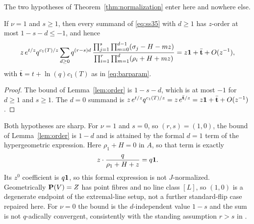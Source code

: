 The two hypotheses of Theorem~\ref{thm:normalization} enter here and nowhere
else.

\begin{corollary}
  \label{cor:normalized}
  If \(\nu=1\) and \(s\ge1\), then every summand of \eqref{eq:ss35} with
  \(d\ge1\) has \(z\)-order at most \(1-s-d\le-1\), and hence
  \[
    z\,e^{t/z}q^{c_{1}(T)/z}
    \sum_{d\ge0}q^{(r-s)d}\,
    \frac{\prod_{j=1}^{s}\prod_{m=0}^{d-1}(\sigma_{j}-H-mz)}
         {\prod_{i=1}^{r}\prod_{m=1}^{d}(\rho_{i}+H+mz)}
    =z\mathbf 1+\bar{\mathbf t}+O(z^{-1}),
  \]
  with \(\bar{\mathbf t}=t+\ln(q)c_{1}(T)\) as in \eqref{eq:barparam}.
\end{corollary}

\begin{proof}
  The bound of Lemma~\ref{lem:order} is \(1-s-d\), which is at most \(-1\)
  for \(d\ge1\) and \(s\ge1\).  The \(d=0\) summand is
  \(z\,e^{t/z}q^{c_{1}(T)/z}=z\,e^{\bar{\mathbf t}/z}
  =z\mathbf 1+\bar{\mathbf t}+O(z^{-1})\).
\end{proof}

\begin{remark}
  \label{rem:boundary}
  Both hypotheses are sharp.  For \(\nu=1\) and \(s=0\), so \((r,s)=(1,0)\),
  the bound of Lemma~\ref{lem:order} is \(1-d\) and is attained by the formal
  \(d=1\) term of the hypergeometric expression.  Here \(\rho_{1}+H=0\) in
  \(A\), so that term is exactly
  \[
    z\cdot\frac{q}{\rho_{1}+H+z}=q\mathbf 1 .
  \]
  Its \(z^{0}\) coefficient is \(q\mathbf 1\), so this formal expression is not
  \(J\)-normalized.  Geometrically \(\mathbf P(V)=Z\) has point fibres and no line
  class \([L]\), so \((1,0)\) is a degenerate endpoint of the extremal-line
  setup, not a further standard-flip case repaired here.  For \(\nu=0\) the bound is the
  \(d\)-independent value \(1-s\) and the sum is not \(q\)-adically
  convergent, consistently with the standing assumption \(r>s\) in \cite{SS}.
\end{remark}

